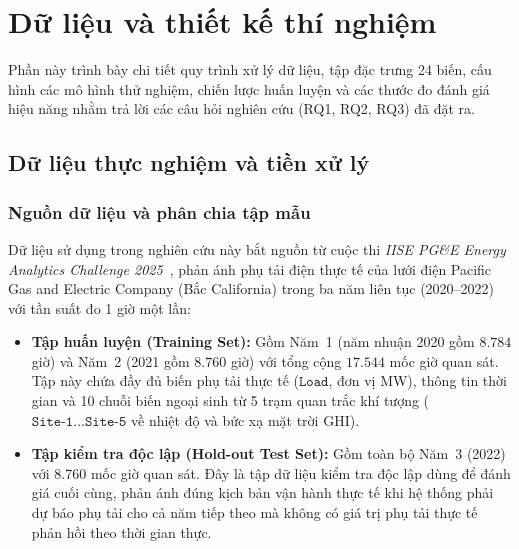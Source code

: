 \section{Dữ liệu và thiết kế thí nghiệm}
\label{sec:experiments}

Phần này trình bày chi tiết quy trình xử lý dữ liệu, tập đặc trưng 24 biến, cấu hình các mô hình thử nghiệm, chiến lược huấn luyện và các thước đo đánh giá hiệu năng nhằm trả lời các câu hỏi nghiên cứu (RQ1, RQ2, RQ3) đã đặt ra.

\subsection{Dữ liệu thực nghiệm và tiền xử lý}
\label{subsec:data_pipeline}

\subsubsection{Nguồn dữ liệu và phân chia tập mẫu}
Dữ liệu sử dụng trong nghiên cứu này bắt nguồn từ cuộc thi \textit{IISE PG\&E Energy Analytics Challenge 2025}~\cite{pge2025zenodo}, phản ánh phụ tải điện thực tế của lưới điện Pacific Gas and Electric Company (Bắc California) trong ba năm liên tục (2020--2022) với tần suất đo 1 giờ một lần:
\begin{itemize}
    \item \textbf{Tập huấn luyện (Training Set):} Gồm Năm~1 (năm nhuận 2020 gồm $8.784$ giờ) và Năm~2 (2021 gồm $8.760$ giờ) với tổng cộng $17.544$ mốc giờ quan sát. Tập này chứa đầy đủ biến phụ tải thực tế ($\texttt{Load}$, đơn vị MW), thông tin thời gian và 10 chuỗi biến ngoại sinh từ 5 trạm quan trắc khí tượng ($\texttt{Site-1}\ldots\texttt{Site-5}$ về nhiệt độ và bức xạ mặt trời GHI).
    \item \textbf{Tập kiểm tra độc lập (Hold-out Test Set):} Gồm toàn bộ Năm~3 (2022) với 8.760 mốc giờ quan sát. Đây là tập dữ liệu kiểm tra độc lập dùng để đánh giá cuối cùng, phản ánh đúng kịch bản vận hành thực tế khi hệ thống phải dự báo phụ tải cho cả năm tiếp theo mà không có giá trị phụ tải thực tế phản hồi theo thời gian thực.
\end{itemize}

